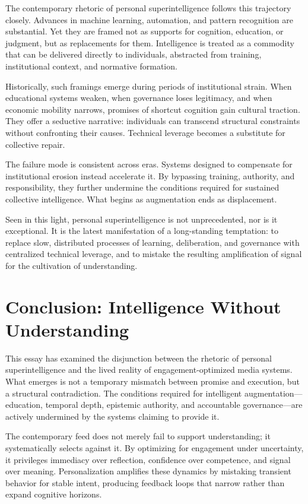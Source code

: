 \documentclass[12pt]{article}
\begin{document}
The contemporary rhetoric of personal superintelligence follows this trajectory closely. Advances in machine learning, automation, and pattern recognition are substantial. Yet they are framed not as supports for cognition, education, or judgment, but as replacements for them. Intelligence is treated as a commodity that can be delivered directly to individuals, abstracted from training, institutional context, and normative formation.

Historically, such framings emerge during periods of institutional strain. When educational systems weaken, when governance loses legitimacy, and when economic mobility narrows, promises of shortcut cognition gain cultural traction. They offer a seductive narrative: individuals can transcend structural constraints without confronting their causes. Technical leverage becomes a substitute for collective repair.

The failure mode is consistent across eras. Systems designed to compensate for institutional erosion instead accelerate it. By bypassing training, authority, and responsibility, they further undermine the conditions required for sustained collective intelligence. What begins as augmentation ends as displacement.

Seen in this light, personal superintelligence is not unprecedented, nor is it exceptional. It is the latest manifestation of a long-standing temptation: to replace slow, distributed processes of learning, deliberation, and governance with centralized technical leverage, and to mistake the resulting amplification of signal for the cultivation of understanding.

\section{Conclusion: Intelligence Without Understanding}

This essay has examined the disjunction between the rhetoric of personal superintelligence and the lived reality of engagement-optimized media systems. What emerges is not a temporary mismatch between promise and execution, but a structural contradiction. The conditions required for intelligent augmentation—education, temporal depth, epistemic authority, and accountable governance—are actively undermined by the systems claiming to provide it.

The contemporary feed does not merely fail to support understanding; it systematically selects against it. By optimizing for engagement under uncertainty, it privileges immediacy over reflection, confidence over competence, and signal over meaning. Personalization amplifies these dynamics by mistaking transient behavior for stable intent, producing feedback loops that narrow rather than expand cognitive horizons.
\end{document}
